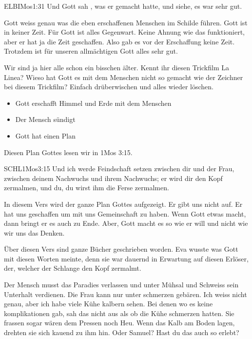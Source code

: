\documentclass{../../inc/mybib}
\begin{document}
\begin{spacing}{1.5}
\begin{block}
        \begin{bibelbox}{ELB}{IMos}{1:31}
            Und Gott sah , was er gemacht hatte, und siehe, es war sehr gut. 
        \end{bibelbox}
         Gott weiss genau was die eben erschaffenen Menschen im Schilde führen. Gott ist in keiner Zeit. Für Gott ist alles Gegenwart. Keine Ahnung wie das funktioniert, aber er hat ja die Zeit geschaffen. Also gab es vor der Erschaffung keine Zeit. Trotzdem ist für unseren allmächtigen Gott alles sehr gut.

        Wir sind ja hier alle schon ein bisschen älter. Kennt ihr diesen Trickfilm La Linea? Wieso hat Gott es mit dem Menschen nicht so gemacht wie der Zeichner bei diesem Trickfilm? Einfach drüberwischen und alles wieder löschen.
        \begin{itemize}
            \item Gott erschafft Himmel und Erde mit dem Menschen
            \item Der Mensch sündigt
            \item Gott hat einen Plan
        \end{itemize}
        
        Diesen Plan Gottes lesen wir in 1Mos 3:15. 
        \begin{bibelbox}{SCHL}{1Mos}{3:15}
            Und ich werde Feindschaft setzen zwischen dir und der Frau, zwischen deinem Nachwuchs und ihrem Nachwuchs; er wird dir den Kopf zermalmen, und du, du wirst ihm die Ferse zermalmen.
        \end{bibelbox}
        In diesem Vers wird der ganze Plan Gottes aufgezeigt. Er gibt uns nicht auf. Er hat uns geschaffen um mit uns Gemeinschaft zu haben. Wenn Gott etwas macht, dann bringt er es auch zu Ende. Aber, Gott macht es so wie er will und nicht wie wir uns das Denken.

        Über diesen Vers sind ganze Bücher geschrieben worden. Eva wusste was Gott mit diesen Worten meinte, denn sie war dauernd in Erwartung auf diesen Erlöser, der, welcher der Schlange den Kopf zermalmt. 
    \end{block} 
    \begin{block}[ABER]
        Der Mensch musst das Paradies verlassen und unter Mühsal und Schweiss sein Unterhalt verdienen. Die Frau kann nur unter schmerzen gebären. Ich weiss nicht genau, aber ich habe viele Kühe kalbern sehen. Bei denen wo es keine komplikationen gab, sah das nicht aus als ob die Kühe schmerzen hatten. Sie frassen sogar wären dem Pressen noch Heu. Wenn das Kalb am Boden lagen, drehten sie sich kauend zu ihm hin. Oder Samuel? Hast du das auch so erlebt?
        

\end{block}
\end{spacing}
\end{document}
